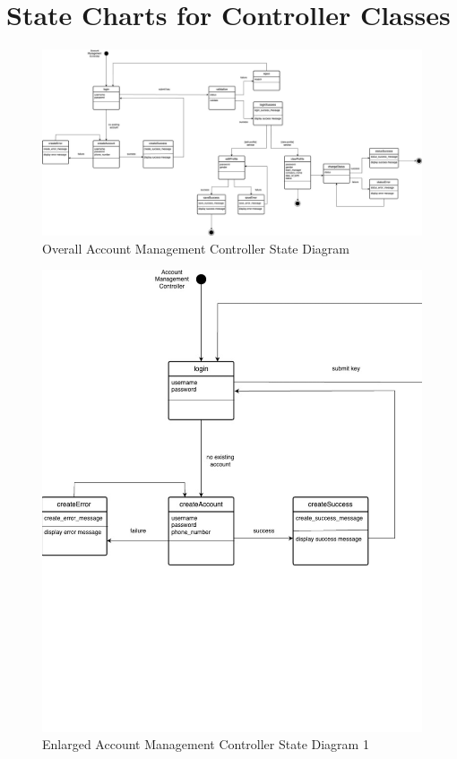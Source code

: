 \documentclass[]{article}
\begin{document}
\section{State Charts for Controller Classes}
\label{sec:state_charts_for_controller_classes}
\renewcommand{\thefigure}{2.\arabic{figure}}
\begin{figure}[H]
	\centering
	\includegraphics[scale=0.25]{account-controller.jpg}
	\caption{Overall Account Management Controller State Diagram}
	\label{fig:account-controller}
\end{figure}

\renewcommand{\thefigure}{2.2.\arabic{figure}}
\setcounter{figure}{0}
\begin{figure}[H]
	\centering
	\includegraphics[scale=0.75]{account-1.png}
	\caption{Enlarged Account Management Controller State Diagram 1}
	\label{fig:authentication-controller}
\end{figure}
\end{document}
